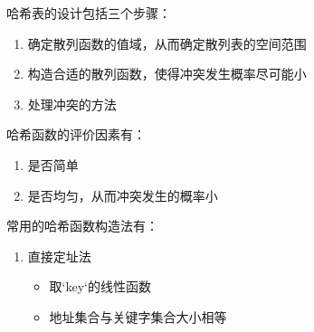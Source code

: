 \documentclass[a4paper,11pt]{article}%
\begin{document}
哈希表的设计包括三个步骤：
\begin{enumerate}
    \item 确定散列函数的值域，从而确定散列表的空间范围
\item 构造合适的散列函数，使得冲突发生概率尽可能小
\item 处理冲突的方法
\end{enumerate}

哈希函数的评价因素有：
\begin{enumerate}
    \item 是否简单
\item 是否均匀，从而冲突发生的概率小
\end{enumerate}

常用的哈希函数构造法有：
\begin{enumerate}
\item 直接定址法
\begin{itemize}
    \item 取`key`的线性函数
    \item 地址集合与关键字集合大小相等
\end{itemize}


\end{enumerate}
\end{document}
